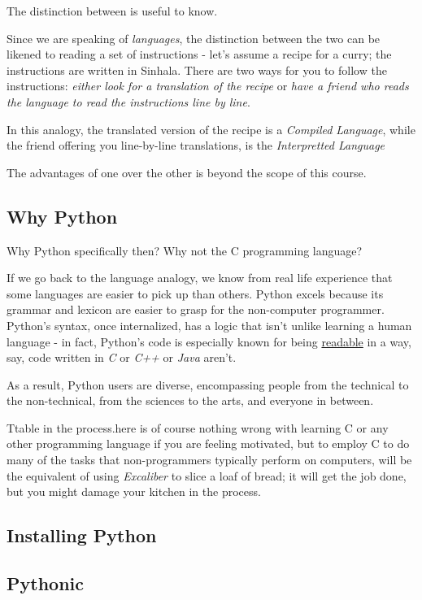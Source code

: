 \documentclass[11pt]{article}
\begin{document}
The distinction between is useful to know.

Since we are speaking of \emph{languages}, the distinction between the two can be likened to reading a set of instructions - let's assume a recipe for a curry; the instructions are written in Sinhala. There are two ways for you to follow the instructions: \emph{either look for a translation of the recipe} or \emph{have a friend who reads the language to read the instructions line by line}.

In this analogy, the translated version of the recipe is a \emph{Compiled Language}, while the friend offering you line-by-line translations, is the \emph{Interpretted Language}

The advantages of one over the other is beyond the scope of this course.

\subsection{Why Python}
\label{sec:org66f880d}
Why Python specifically then? Why not the C programming language?

If we go back to the language analogy, we know from real life experience that some languages are easier to pick up than others. Python excels because its grammar and lexicon are easier to grasp for the non-computer programmer. Python's syntax, once internalized, has a logic that isn't unlike learning a human language - in fact, Python's code is especially known for being \uline{readable} in a way, say, code written in \emph{C} or \emph{C++} or \emph{Java} aren't.

As a result, Python users are diverse, encompassing people from the technical to the non-technical, from the sciences to the arts, and everyone in between.

Ttable in the process.here is of course nothing wrong with learning C or any other programming language if you are feeling motivated, but to employ C to do many of the tasks that non-programmers typically perform on computers, will be the equivalent of using \emph{Excaliber} to slice a loaf of bread; it will get the job done, but you might damage your kitchen in the process.

\subsection{Installing Python}
\label{sec:org0d917b4}
\subsection{Pythonic}
\label{sec:org634f7d5}
\end{document}
